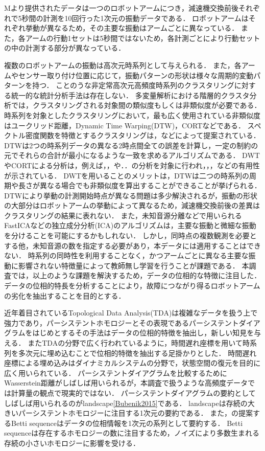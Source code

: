 \documentclass{jarticle}
\begin{document}
Mより提供されたデータは一つのロボットアームにつき，減速機交換前後それぞれで5秒間の計測を10回行った1次元の振動データである．
ロボットアームはそれぞれ挙動が異なるため，その主要な振動はアームごとに異なっている．
また，各アームの行動1セットは5秒間ではないため，各計測ごとにより行動セットの中の計測する部分が異なっている．

複数のロボットアームの振動は高次元時系列として与えられる．
また，各アームやセンサー取り付け位置に応じて，振動パターンの形状は様々な周期的変動パターンを持つ．
ことのうな非定常高次元高頻度時系列のクラスタリングに対する統一的な統計分析手法は存在しない．
多変量解析における階層的クラスタ分析では，クラスタリングされる対象間の類似度もしくは非類似度が必要である．
時系列を対象としたクラスタリングにおいて，最も広く使用されている非類似度はユークリッド距離，Dynamic Time Warping(DTW)\cite{Berndt1996}，CORT\cite{Chouakria2007}などである．
スペクトル密度関数を特徴とするクラスタリングは，などによって提案されている．
DTWは2つの時系列データの異なる2時点間全ての誤差を計算し，一定の制約の元でそれらの合計が最小になるような一致を求めるアルゴリズムである．
DWTやCORTによる分析は，例えば，，や．．の分析を対象に行われ，，，などの有用性が示されている．
DWTを用いることのメリットは，DTWは二つの時系列の周期や長さが異なる場合でも非類似度を算出することができることが挙げられる．
DTWにより挙動の計測開始時点が異なる問題は多少解決されるが，振動の形状の大部分はロボットアームの挙動によって異なるため，減速機交換前後の差異はクラスタリングの結果に表れない．
また，未知音源分離などで用いられるFastICA\cite{Hyvarinen2000}などの独立成分分析(ICA)のアルゴリズムは，主要な振動と微細な振動を分けることを可能にするかもしれない．
しかし，同時点の複数観測を必要とする他，未知音源の数を指定する必要があり，本データには適用することはできない．
時系列の同時性を利用することなく，かつアームごとに異なる主要な振動に影響されない特徴量によって教師無し学習を行うことが課題である．
本調査では，以上のような課題を解決するため，データの位相的な特徴に注目した．
データの位相的特長を分析することにより，故障につながり得るロボットアームの劣化を抽出することを目的とする．

近年着目されているTopological Data Analysis(TDA)は複雑なデータを扱う上で強力であり，パーシステントホモロジー\cite{Edelsbrunner2002}とその表現であるパーシステントダイアグラム\cite{Otter2017}をはじめとするその手法はデータの位相的特徴を抽出し，新しい知見を与える．
またTDAの分野で広く行われているように，時間遅れ座標を用いて時系列を多次元に埋め込むことで位相的特徴を抽出する足掛かりとした．
時間遅れ座標による埋め込みはダイナミカルシステムの分野で，状態空間の復元を目的に広く用いられている．
パーシステントダイアグラムを比較するためにWasserstein距離\cite{Mileyko2011}がしばしば用いられるが，本調査で扱うような高頻度データでは計算量の観点で現実的ではない．
パーシステントダイアグラムの要約としてしばしば用いられるのがlandscape\ref{Bubenik2015}である．
landscapeは存続の大きいパーシステントホモロジーに注目する1次元の要約である．
また，\cite{Umeda2017}の提案するBetti sequenceはデータの位相情報を1次元の系列として要約する．
Betti sequenceは存在するホモロジーの数に注目するため，ノイズにより多数生まれる存続の小さいホモロジーに影響を受ける．
\end{document}
